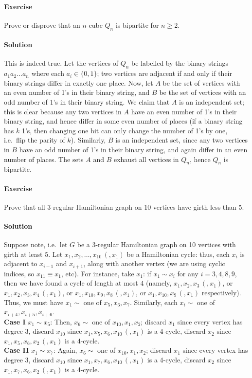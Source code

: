 \documentclass[10pt]{article}
\newcounter{prob}
\newcommand{\problem}{\stepcounter{prob}\paragraph{Exercise \arabic{prob}}}
\newcommand{\solution}{\paragraph{Solution}}
\begin{document}
    \problem Prove or disprove that an $n$-cube $Q_n$ is bipartite for $n \geq 2$.

    \solution This is indeed true. Let the vertices of $Q_n$ be labelled by the
    binary strings $a_1a_2\dots a_n$ where each $a_i \in \{0, 1\}$; two vertices are
    adjacent if and only if their binary strings differ in exactly one place. Now,
    let $A$ be the set of vertices with an even number of 1's in their binary string,
    and $B$ be the set of vertices with an odd number of 1's in their binary string.
    We claim that $A$ is an independent set; this is clear because any two vertices
    in $A$ have an even number of 1's in their binary string, and hence differ in
    some even number of places (if a binary string has $k$ 1's, then changing one bit
    can only change the number of 1's by one, i.e.\ flip the parity of $k$).
    Similarly, $B$ is an independent set, since any two vertices in $B$ have an odd
    number of 1's in their binary string, and again differ in an even number of
    places. The sets $A$ and $B$ exhaust all vertices in $Q_n$, hence $Q_n$ is
    bipartite.


    \problem Prove that all 3-regular Hamiltonian graph on 10 vertices have girth
    less than 5.

    \solution Suppose note, i.e.\ let $G$ be a 3-regular Hamiltonian graph on 10
    vertices with girth at least $5$. Let $x_1, x_2, \dots, x_{10}\, (, x_1)$ be a
    Hamiltonian cycle: thus, each $x_i$ is adjacent to $x_{i - 1}$ and $x_{i + 1}$,
    along with another vertex (we are using cyclic indices, so $x_{11} \equiv x_1$,
    etc). For instance, take $x_1$: if $x_1 \sim x_i$ for any $i = 3, 4, 8, 9$, then
    we have found a cycle of length at most $4$ (namely, $x_1, x_2, x_3\, (, x_1)$,
    or $x_1, x_2, x_3, x_4\, (, x_1)$, or $x_1, x_{10}, x_9, x_8\, (, x_1)$, or $x_1,
    x_{10}, x_9\, (, x_1)$ respectively). Thus, we must have $x_1 \sim$ one of $x_5,
    x_6, x_7$. Similarly, each $x_i \sim$ one of $x_{i + 4}, x_{i + 5}, x_{i + 6}$. \\

    \textbf{Case I} $x_1 \sim x_5$: Then, $x_6 \sim$ one of $x_{10}, x_1, x_2$;
    discard $x_1$ since every vertex has degree $3$, discard $x_{10}$ since $x_1,
    x_5, x_6, x_{10}\, (, x_1)$ is a 4-cycle, discard $x_2$ since $x_1, x_5, x_6,
    x_2\, (, x_1)$ is a 4-cycle. \\
    
    \textbf{Case II} $x_1 \sim x_7$: Again, $x_6 \sim$ one of $x_{10}, x_1, x_2$;
    discard $x_1$ since every vertex has degree $3$, discard $x_{10}$ since $x_1,
    x_7, x_6, x_{10}\, (, x_1)$ is a 4-cycle, discard $x_2$ since $x_1, x_7, x_6,
    x_2\, (, x_1)$ is a 4-cycle. \\
\end{document}
